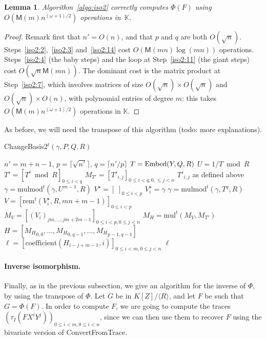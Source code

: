 \documentclass[12pt]{article}
\def\M {\ensuremath{\mathsf{M}}}
\def\K {\ensuremath{\mathbb{K}}}
\def\mul {\ensuremath{\mathrm{mul}}}
\def\rem {\ensuremath{\mathrm{rem}}}
\def\coeff {\ensuremath{\mathrm{coefficient}}}
\def\mulmod {\ensuremath{\mathrm{mulmod}}}
\newtheorem{Lemma}{Lemma}
\begin{document}
\begin{Lemma}
  Algorithm~\ref{algo:iso2} correctly computes $\Phi(F)$ using
  $O(\M(m) n^{(\omega+1)/2} )$ operations in~$\K$.
\end{Lemma}
\begin{proof}
  Remark first that $n'=O(n)$, and that $p$ and $q$ are both
  $O(\sqrt{n})$. Steps~\ref{iso2:2},~\ref{iso2:3} and~\ref{iso2:14}
  cost $O(\M(mn)\log(mn))$ operations. Steps~\ref{iso2:4} (the baby
  steps) and the loop at Step~\ref{iso2:11} (the giant steps) cost
  $O(\sqrt{n}\M(mn))$. The dominant cost is the matrix product at
  Step~\ref{iso2:7}, which involves matrices of size $O(\sqrt{n})
  \times O(\sqrt{n})$ and $O(\sqrt{n}) \times O(n)$, with polynomial
  entries of degree $m$: this takes $O(\M(m) n^{(\omega+1)/2})$ 
  operations in $\K$.
\end{proof}

As before, we will need the transpose of this algorithm (todo: more
explanations).
\begin{algorithm}[H]
  \caption{ChangeBasis2$^t(\gamma,P,Q,R)$}
  \begin{algorithmic}[1]
    \STATE $n'=m+n-1$, $p=\lceil \sqrt {n'} \rceil$, $q=\lceil n'/p\rceil$
    \STATE $T={\rm Embed}(Y,Q,R)$
    \STATE $U=1/T \bmod R$
    \STATE $T'=[T^i \bmod R]_{0 \le i < q}$
    \STATE $M_{T'}=[T'_{i,j}]_{0\le i < q, 0, \le j < n}$ \hfill $T'_{i,j}$ as defined above
    \STATE $\gamma = \mulmod^t(\gamma, U^{m-1}, R)$
    \STATE $V^\star=[\ ]_{0 \le i < p}$
    \STATE $V^\star_i = \gamma$
    \STATE $\gamma = \mulmod^t(\gamma,T^q,R)$
    \ENDFOR
    \STATE $V = [\rem^t(V^\star_i,R,mn+m-1)]_{0 \le i < p}$
    \STATE $M_V = [(V_{i})_{jm,\dots,jm+2m-1}]_{0 \le i < p, 0 \le j < n}$
    \STATE $M_H = \mul^t(M_V, M_{T'})$
    \STATE $H=[{M_H}_{0,0},\dots,{M_H}_{0,q-1},\dots,{M_H}_{p-1,q-1}]$
    \STATE $\ell=[\coeff(H_{i-j+m-1},i)]_{0 \le i < m, 0 \le j < n}$
    \RETURN $\ell$
  \end{algorithmic}
  \label{algo:tiso2}
\end{algorithm}

\paragraph{Inverse isomorphism.} Finally, as in the previous subsection, we 
give an algorithm for the inverse of $\Phi$, by using the transpose of
$\Phi$. Let $G$ be in $K[Z]/\langle R\rangle$, and let $F$ be such
that $G=\Phi(F)$. In order to compute $F$, we are going to compute the
traces $(\tau_I(F X^i Y^j))_{0 \le i < m, 0 \le i < n}$, since we can
then use them to recover $F$ using the bivariate version of
ConvertFromTrace.
\end{document}
